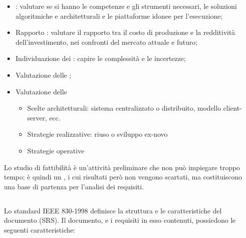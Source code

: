 \begin{itemize}
  \item {}: valutare se si hanno le
    competenze e gli strumenti necessari, le soluzioni algoritmiche e
    architetturali e le piattaforme idonee per l'esecuzione;
  \item Rapporto : valutare il rapporto tra il costo di
    produzione e la redditività dell'investimento, nei confronti del mercato
    attuale e futuro;
  \item Individuazione dei : capire le complessità e le
    incertezze;
  \item Valutazione delle ;
  \item Valutazione delle 

    \begin{itemize}
      \item Scelte architetturali: sistema centralizzato o distribuito, modello
            client-server, ecc.
      \item Strategie realizzative: riuso o sviluppo ex-novo
      \item Strategie operative
    \end{itemize}

\end{itemize}

Lo studio di fattibilità è un'attività preliminare che non può impiegare troppo
tempo; è quindi un , i cui risultati però non vengono
scartati, ma costituiscono una base di partenza per l'analisi dei requisiti.

\subsection{}

Lo standard IEEE 830-1998 definisce la struttura e le caratteristiche del
documento  (SRS). Il documento, e
i requisiti in esso contenuti, possiedono le seguenti caratteristiche:

